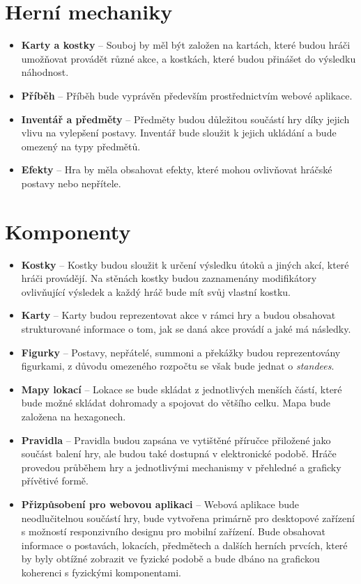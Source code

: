 \section{Herní mechaniky}
\label{sec:req_mechanics}

\begin{itemize}
    \item \textbf{Karty a kostky} -- 
        Souboj by měl být založen na kartách, které budou hráči umožňovat provádět různé akce, a kostkách, které budou přinášet do výsledku náhodnost.
    \item \textbf{Příběh} -- 
        Příběh bude vyprávěn především prostřednictvím webové aplikace.
    \item \textbf{Inventář a předměty} -- 
        Předměty budou důležitou součástí hry díky jejich vlivu na vylepšení postavy. Inventář bude sloužit k jejich ukládání a bude omezený na typy předmětů.
    \item \textbf{Efekty} -- 
        Hra by měla obsahovat efekty, které mohou ovlivňovat hráčské postavy nebo nepřítele.
\end{itemize}

\section{Komponenty}
\label{sec:req_components}

\begin{itemize}
    \item \textbf{Kostky} -- 
        Kostky budou sloužit k určení výsledku útoků a jiných akcí, které hráči provádějí. Na stěnách kostky budou zaznamenány modifikátory ovlivňující výsledek a každý hráč bude mít svůj vlastní kostku.
    \item \textbf{Karty} --
        Karty budou reprezentovat akce v rámci hry a budou obsahovat strukturované informace o tom, jak se daná akce provádí a jaké má následky.
    \item \textbf{Figurky} --
        Postavy, nepřátelé, summoni a překážky budou reprezentovány figurkami, z důvodu omezeného rozpočtu se však bude jednat o \textit{standees}.
    \item \textbf{Mapy lokací} --
        Lokace se bude skládat z jednotlivých menších částí, které bude možné skládat dohromady a spojovat do většího celku. Mapa bude založena na hexagonech.
    \item \textbf{Pravidla} --
        Pravidla budou zapsána ve vytištěné příručce přiložené jako součást balení hry, ale budou také dostupná v elektronické podobě. Hráče provedou průběhem hry a jednotlivými mechanismy v přehledné a graficky přívětivé formě.
    \item \textbf{Přizpůsobení pro webovou aplikaci} --
        Webová aplikace bude neodlučitelnou součástí hry, bude vytvořena primárně pro desktopové zařízení s možností responzivního designu pro mobilní zařízení. Bude obsahovat informace o postavách, lokacích, předmětech a dalších herních prvcích, které by byly obtížné zobrazit ve fyzické podobě a bude dbáno na grafickou koherenci s fyzickými komponentami.
\end{itemize}

